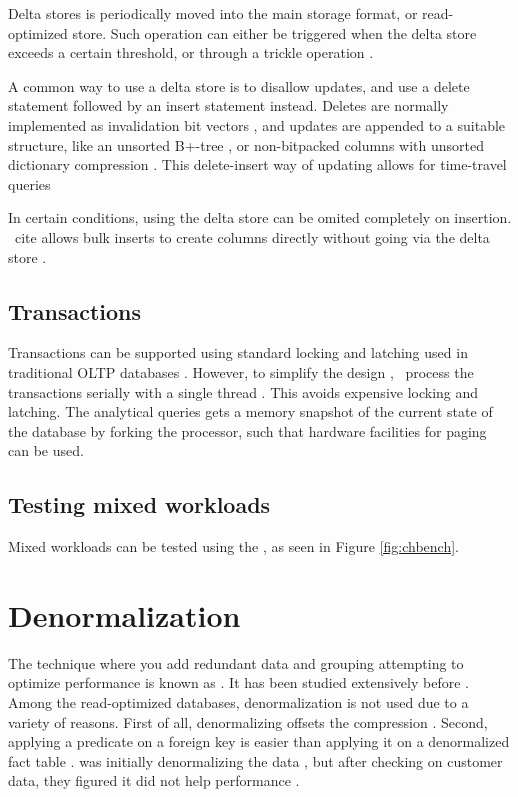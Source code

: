 Delta stores is periodically moved into the main storage format, or read-optimized store. Such operation can either be triggered when the delta store exceeds a certain threshold, or through a trickle operation \cite{Lahiri2015-mz, Farber2012-vh}.

A common way to use a delta store is to disallow updates, and use a delete statement followed by an insert statement instead. Deletes are normally implemented as invalidation bit vectors \cite{Raman2013-em, Lamb2012-kg}, and updates are appended to a suitable structure, like an unsorted B+-tree \cite{Psaroudakis2014-ma}, or non-bitpacked columns with unsorted dictionary compression \cite{Farber2012-vh}. This delete-insert way of updating allows for time-travel queries \cite{Scwalb2014-hn, Plattner2014-fr}

In certain conditions, using the delta store can be omited completely on insertion. \mssql~cite allows bulk inserts to create columns directly without going via the delta store \cite{Larson2013-mc}.

\subsection{Transactions}
\label{sub:Transactions}
Transactions can be supported using standard locking and latching used in traditional OLTP databases \cite{Lamb2012-kg}. However, to simplify the design , \hyper~process the transactions serially with a single thread \cite{Psaroudakis2014-ma}. This avoids expensive locking and latching. The analytical queries gets a memory snapshot of the current state of the database by forking the processor, such that hardware facilities for paging can be used.

\subsection{Testing mixed workloads}
\label{sub:Testing mixed workloads}
Mixed workloads can be tested using the \chbench, as seen in Figure \ref{fig:chbench}.

\section{Denormalization}
\label{sec:Denormalization}
The technique where you add redundant data and grouping attempting to optimize performance is known as  \cite{Wikipedia_contributors2015-az}. It has been studied extensively before \cite{Raman2008-gi}. Among the read-optimized databases, denormalization is not used due to a variety of reasons. First of all, denormalizing offsets the compression \cite{Barber2012-xt}. Second, applying a predicate on a foreign key is easier than applying it on a denormalized fact table \cite{Abadi2008-dd}. \blink was initially denormalizing the data \cite{Johnson2008-cp}, but after checking on customer data, they figured it did not help performance \cite{Barber2012-xt}.

